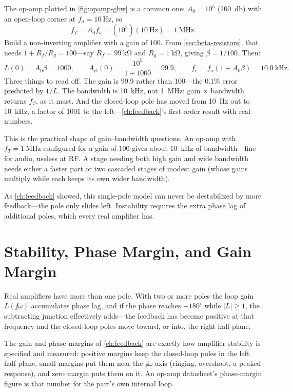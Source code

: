 \begin{workedbox}
The op-amp plotted in \cref{fig:opamp-gbw} is a common one: \(A_0=10^5\)
(\SI{100}{\decibel}) with an open-loop corner at \(f_a=\SI{10}{\hertz}\), so
\[
f_T=A_0f_a=(10^5)(\SI{10}{\hertz})=\SI{1}{\mega\hertz}.
\]
Build a non-inverting amplifier with a gain of \(100\). From
\cref{sec:beta-resistors}, that needs \(1+R_f/R_g=100\)---say
\(R_f=\SI{99}{\kilo\ohm}\) and \(R_g=\SI{1}{\kilo\ohm}\), giving
\(\beta=1/100\). Then:
\[
L(0)=A_0\beta=1000,
\qquad
A_{\mathrm{cl}}(0)=\frac{10^5}{1+1000}=99.9,
\qquad
f_c=f_a(1+A_0\beta)=\SI{10.0}{\kilo\hertz}.
\]
Three things to read off. The gain is \(99.9\) rather than \(100\)---the \(0.1\%\)
error predicted by \(1/L\). The bandwidth is \SI{10}{\kilo\hertz}, not
\SI{1}{\mega\hertz}: gain \(\times\) bandwidth returns \(f_T\), as it must. And the
closed-loop pole has moved from \SI{10}{\hertz} out to \SI{10}{\kilo\hertz}, a factor
of \(1001\) to the left---\cref{ch:feedback}'s first-order result with real numbers.
\end{workedbox}

\begin{exambox}
This is the practical shape of gain--bandwidth questions. An op-amp with
\(f_T=\SI{1}{\mega\hertz}\) configured for a gain of \(100\) gives about
\SI{10}{\kilo\hertz} of bandwidth---fine for audio, useless at RF. A stage needing
both high gain and wide bandwidth needs either a faster part or two cascaded stages of
modest gain (whose gains multiply while each keeps its own wider bandwidth).
\end{exambox}

As \cref{ch:feedback} showed, this single-pole model can never be destabilized by
more feedback---the pole only slides left. Instability requires the extra phase lag
of additional poles, which every real amplifier has.

\section{Stability, Phase Margin, and Gain Margin}
Real amplifiers have more than one pole. With two or more poles the loop gain
\(L(\jj\omega)\) accumulates phase lag, and if the phase reaches \(-180^\circ\)
while \(|L|\ge 1\), the subtracting junction effectively adds---the feedback has
become positive at that frequency and the closed-loop poles move toward, or
into, the right half-plane.

The gain and phase margins of \cref{ch:feedback} are exactly how amplifier
stability is specified and measured: positive margins keep the closed-loop poles in
the left half-plane, small margins put them near the \(\jj\omega\) axis (ringing,
overshoot, a peaked response), and zero margin puts them on it. An op-amp datasheet's
phase-margin figure is that number for the part's own internal loop.

